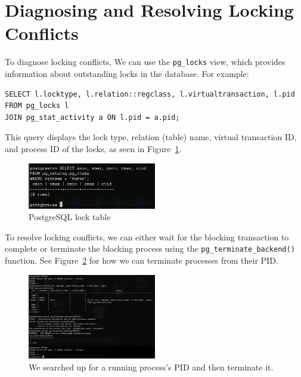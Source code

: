\documentclass{article}
\def\c#1{\texttt{#1}}
\begin{document}
\section{Diagnosing and Resolving Locking Conflicts} %
\label{sec:Diagnosing and Resolving Locking Conflicts}
To diagnose locking conflicts, We can use the \c{pg\_locks} view, which provides information about outstanding locks in the database. For example:
\begin{lstlisting}
SELECT l.locktype, l.relation::regclass, l.virtualtransaction, l.pid
FROM pg_locks l
JOIN pg_stat_activity a ON l.pid = a.pid;
\end{lstlisting}
This query displays the lock type, relation (table) name, virtual transaction ID, and process ID of the locks, as seen in Figure~\ref{fig:pg_lock}.
\begin{figure}
	\begin{center}
		\includegraphics[width=0.5\textwidth]{figures/pg_lock.png}
	\end{center}
	\caption{PostgreSQL lock table}\label{fig:pg_lock}
\end{figure}

To resolve locking conflicts, we can either wait for the blocking transaction to complete or terminate the blocking process using the \c{pg\_terminate\_backend()} function. See Figure~\ref{fig:terminate pid} for how we can terminate processes from their PID.
\begin{figure}
	\begin{center}
		\includegraphics[width=0.5\textwidth]{figures/terminating_pid.png}
	\end{center}
	\caption{We searched up for a running process's PID and then terminate it.}\label{fig:terminate pid}
\end{figure}
\end{document}
